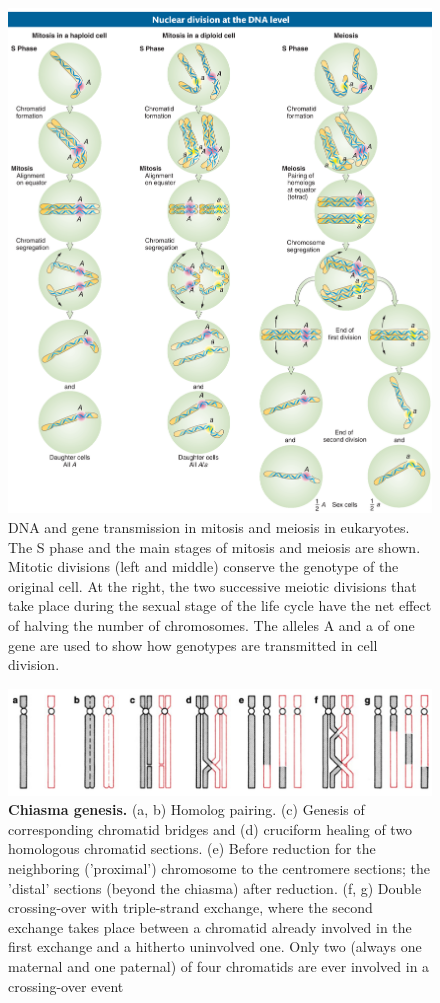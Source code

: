 \documentclass[11pt,ignorenonframetext,aspectratio=169]{beamer}
\begin{document}
\begin{frame}{}
\protect\hypertarget{section-14}{}
\begin{figure}

{\centering \includegraphics[width=0.45\linewidth]{../images/nuclear_division_dna} 

}

\caption{DNA and gene transmission in mitosis and meiosis in eukaryotes. The S phase and the main stages of mitosis and meiosis are shown. Mitotic divisions (left and middle) conserve the genotype of the original cell. At the right, the two successive meiotic divisions that take place during the sexual stage of the life cycle have the net effect of halving the number of chromosomes. The alleles A and a of one gene are used to show how genotypes are transmitted in cell division.}\label{fig:nuclear-division-dna}
\end{figure}
\end{frame}

\begin{frame}{}
\protect\hypertarget{section-15}{}
\begin{figure}
\includegraphics[width=0.65\linewidth]{../images/chiasma_genesis} \caption{\textbf{Chiasma genesis.} (a, b) Homolog pairing. (c) Genesis of corresponding chromatid bridges and (d) cruciform healing of two homologous chromatid sections. (e) Before reduction for the neighboring ('proximal') chromosome to the centromere sections; the 'distal' sections (beyond the chiasma) after reduction. (f, g) Double crossing-over with triple-strand exchange, where the second exchange takes place between a chromatid already involved in the first exchange and a hitherto uninvolved one. Only two (always one maternal and one paternal) of four chromatids are ever involved in a crossing-over event}\label{fig:chiasmata-structure}
\end{figure}
\end{frame}
\end{document}
